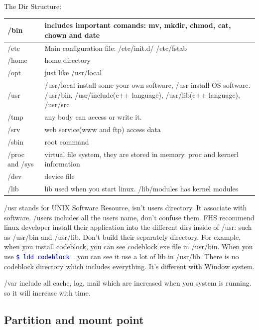 \documentclass[paper=8.5in:11in, twoside, 12pt, pagesize=pdftex]{book}
\newcommand{\linuxcommand}[1]{\texttt{\textcolor{blue}{\$ #1 \Pisymbol{psy}{191}}}}
\begin{document}
	\par The Dir Structure:
\begin{center}
\begin{tabular}{p{}|p{}}
  \hline
  /bin & includes important comands: mv, mkdir, chmod, cat, chown and date  \\
 \hline  /etc & Main configuration file: /etc/init.d/ /etc/fstab \\
  \hline /home & home directory \\
  \hline /opt & just like /usr/local  \\
  \hline /usr & /usr/local install some your own software, /usr install OS software.  /usr/bin, /usr/include(c++ language), /usr/lib(c++ language),  /usr/src \\
  \hline /tmp & any body can access or write it.     \\
  \hline /srv & web service(www and ftp) access data \\
  \hline /sbin & root command \\
  \hline /proc and /sys & virtual file system, they are stored in memory.  proc and kernerl information \\
  \hline /dev & device file \\
  \hline /lib & lib used when you start linux. /lib/modules has kernel modules \\
  \hline 
\end{tabular} 
 \end{center}
 
 \par /usr stands for UNIX Software Resource, isn't users directory. It associate with software. /users includes all the users name, don't confuse them. FHS recommend linux developer install their application into the different dirs inside of /usr:  such as /usr/bin and /usr/lib. Don't build their separately directory. For example, when you install codeblock, you can see codeblock exe file in /usr/bin. When you use \linuxcommand{ldd codeblock}. you can see it use a lot of lib in /usr/lib. There is no codeblock directory which includes everything.  It's different with Window system.
 		   	
 \par /var include all cache, log, mail which are increased when you system is running. so it will increase with time. 

\subsection{Partition and mount point}
\end{document}
